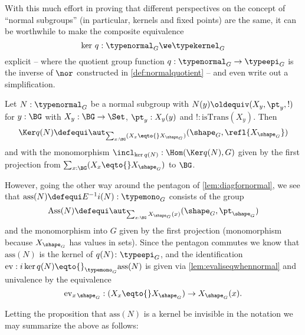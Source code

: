 With this much effort in proving that different perspectives on the concept of ``normal subgroups'' (in particular, kernels and fixed points) are the same, it can be worthwhile to make the composite equivalence
$$\ker\,q:\typenormal_G\we\typekernel_G$$
explicit -- where the quotient group function $q:\typenormal_G\to\typeepi_G$ is the inverse of $\nor$ constructed in \cref{def:normalquotient} --  and even write out a simplification.

Let $N:\typenormal_G$ be a normal subgroup with $N(y)\oldequiv (X_y,\pt_y,!)$ for $y:\BG$ with $X_y:\BG\to\Set$, $\pt_y:X_y(y)$ and $!:\mathrm{isTrans}(X_y)$.
Then
$$\Ker q(N)\defequi\aut_{\sum_{x:\BG}(X_x\eqto{}X_{\shape_G})}(\shape_G,\refl{X_{\shape_G}})
$$
and with the monomorphism $\incl_{\ker q(N)}:\Hom(\Ker q(N),G)$ given by the first projection from $\sum_{x:\BG}(X_x\eqto{}X_{\shape_G})$ to $\BG$.

However, going the other way around the pentagon of \cref{lem:diagfornormal}, we see that $\mathrm{ass}(N)\defequi E^{-1}i(N):\typemono_G$ consists of the group
$$\mathrm{Ass}(N)\defequi\aut_{\sum_{x:\BG}X_{\shape_G}(x)}(\shape_G,\pt_{\shape_G})
$$
and the monomorphism into $G$ given by the first projection (monomorphism because $X_{\shape_G}$ has values in sets).  Since the pentagon commutes we know that $\mathrm{ass}(N)$ is the kernel of $q(N)\colon\typeepi_G$, and the identification $\mathrm{ev}:i\ker q(N)\eqto{}_{\typemono_G}\mathrm{ass}(N)$ is given via \cref{lem:evaliseqwhennormal} and univalence by the equivalence
$$\mathrm{ev}_{x\,\shape_G}:(X_x\eqto{}X_{\shape_G})\to X_{\shape_G}(x)%
.$$



Letting the proposition that $\mathrm{ass}(N)$ is a kernel be invisible in the notation we may summarize the above as follows:

